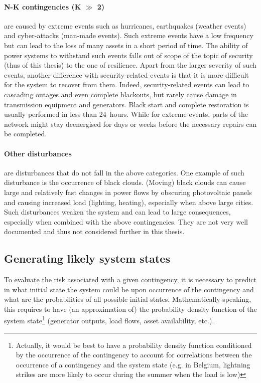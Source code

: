 \paragraph*{N-K contingencies (K \(\gg\) 2)} are caused by extreme events such as hurricanes, earthquakes (weather events) and cyber-attacks (man-made events). Such extreme events have a low frequency but can lead to the loss of many assets in a short period of time. The ability of power systems to withstand such events falls out of scope of the topic of security (thus of this thesis) to the one of resilience. Apart from the larger severity of such events, another difference with security-related events is that it is more difficult for the system to recover from them. Indeed, security-related events can lead to cascading outages and even complete blackouts, but rarely cause damage in transmission equipment and generators. Black start and complete restoration is usually performed in less than 24~hours. While for extreme events, parts of the network might stay deenergised for days or weeks before the necessary repairs can be completed.


\paragraph*{Other disturbances} are disturbances that do not fall in the above categories. One example of such disturbance is the occurrence of black clouds. (Moving) black clouds can cause large and relatively fast changes in power flows by obscuring photovoltaic panels and causing increased load (lighting, heating), especially when above large cities. Such disturbances weaken the system and can lead to large consequences, especially when combined with the above contingencies. They are not very well documented and thus not considered further in this thesis.



\subsection{Generating likely system states}
\label{sec:init_state}

To evaluate the risk associated with a given contingency, it is necessary to predict in what initial state the system could be upon occurrence of the contingency and what are the probabilities of all possible initial states. Mathematically speaking, this requires to have (an approximation of) the probability density function of the system state\footnote{Actually, it would be best to have a probability density function conditioned by the occurrence of the contingency to account for correlations between the occurrence of a contingency and the system state (e.g. in Belgium, lightning strikes are more likely to occur during the summer when the load is low)} (generator outputs, load flows, asset availability, etc.).

